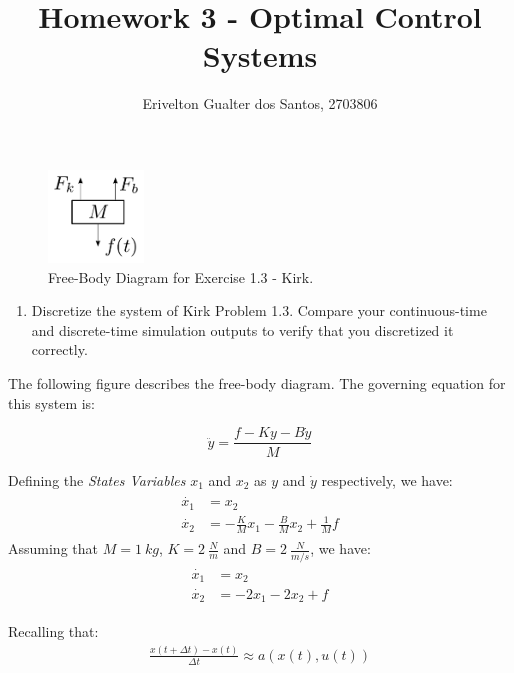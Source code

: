 \documentclass{article}
\begin{document}
\title{Homework 3 - Optimal Control Systems}
\author{Erivelton Gualter dos Santos, 2703806}
\date{}

\maketitle 

\begin{figure}
\includegraphics [width=1in]{output}
\caption{Free-Body Diagram for Exercise 1.3 - Kirk.}
\end{figure} 

\begin{enumerate}[]
\item Discretize the system of Kirk Problem 1.3. Compare your continuous-time and discrete-time simulation outputs to verify that you discretized it correctly.
\end{enumerate}

The following figure describes the free-body diagram. The governing equation for this system is:

\begin{equation*}
\ddot{y} = \frac{f - Ky - B\dot{y}}{M}
\end{equation*}

Defining the \textit{States Variables} $x_1$ and $x_2$ as $y$ and $\dot{y}$ respectively, we have: 
\begin{eqnarray}\label{i1}
\begin{split}
	\dot{x_1} &= x_2 \\
	\dot{x_2} &= -\frac{K}{M}x_1 -\frac{B}{M}x_2 +\frac{1}{M}f
\end{split}
\end{eqnarray}
Assuming that $M = 1\:kg$, $K = 2\:\frac{N}{m}$ and $B = 2\:\frac{N}{m/s}$, we have:
\begin{eqnarray}\label{i1}
\begin{split}
	\dot{x_1} &= x_2 \\
	\dot{x_2} &= -2x_1 -2x_2 + f
\end{split}
\end{eqnarray}

Recalling that: 
\begin{eqnarray}
\frac{x\left(t+\Delta t \right) -x(t)}{\Delta t} \approx a\left(x(t), u(t)\right)
\end{eqnarray}
\end{document}
